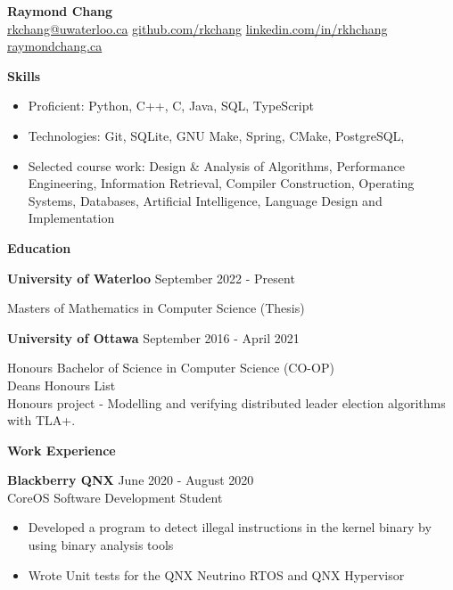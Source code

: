 \documentclass[10pt]{article}
\begin{document}
\begin{center}
    {\huge\textbf{Raymond Chang}} \\
     \href{mailto:rkchang@uwaterloo.ca}{rkchang@uwaterloo.ca}  \space\space
     \href{https://github.com/rkchang}{github.com/rkchang} \space\space
     \href{https://linkedin.com/in/rkhchang}{linkedin.com/in/rkhchang} \\
     \href{https://raymondchang.ca/}{raymondchang.ca} \\ \end{center}

{\Large\textbf{Skills}}\space \hrulefill
\begin{itemize}[noitemsep]
    \item Proficient: Python, C++, C, Java, SQL, TypeScript
    \item Technologies: Git, SQLite, GNU Make, Spring, CMake, PostgreSQL,
    \item Selected course work:  Design \& Analysis of Algorithms, Performance Engineering, Information Retrieval, Compiler Construction, Operating Systems, Databases, Artificial Intelligence, Language Design and Implementation
\end{itemize}

\smallskip

{\Large\textbf{Education}}\space \hrulefill

\textbf{University of Waterloo} \hfill September 2022 - Present

Masters of Mathematics in Computer Science (Thesis)

\hfill

\textbf{University of Ottawa} \hfill September 2016 - April 2021

Honours Bachelor of Science in Computer Science (CO-OP) \\ Deans Honours List \\ Honours project - Modelling and verifying distributed leader election algorithms with TLA+.
\bigskip

{\Large\textbf{Work Experience}}\space \hrulefill

\textbf{Blackberry QNX} \hfill June 2020 - August 2020 \\
CoreOS Software Development Student
\begin{itemize}[noitemsep]
    \item Developed a program to detect illegal instructions in the kernel binary by using binary analysis tools
    \item Wrote Unit tests for the QNX Neutrino RTOS and QNX Hypervisor
\end{itemize}
\end{document}

